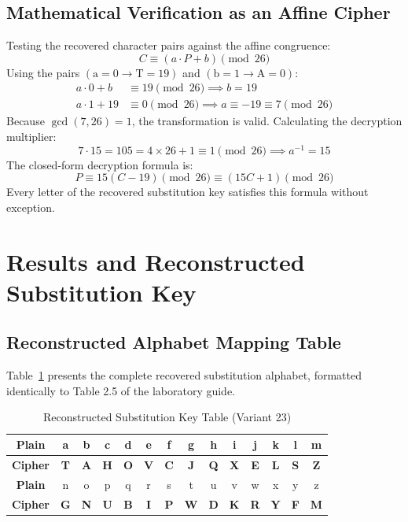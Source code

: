 \documentclass[12pt,a4paper]{article}
\begin{document}
\subsection{Mathematical Verification as an Affine Cipher}
Testing the recovered character pairs against the affine congruence:
\begin{equation}
    C \equiv (a \cdot P + b) \pmod{26}
\end{equation}
Using the pairs $(\text{a} = 0 \to \text{T} = 19)$ and $(\text{b} = 1 \to \text{A} = 0)$:
\begin{align}
    a \cdot 0 + b &\equiv 19 \pmod{26} \implies b = 19 \\
    a \cdot 1 + 19 &\equiv 0 \pmod{26} \implies a \equiv -19 \equiv 7 \pmod{26}
\end{align}
Because $\gcd(7, 26) = 1$, the transformation is valid. Calculating the decryption multiplier:
\begin{equation}
    7 \cdot 15 = 105 = 4 \times 26 + 1 \equiv 1 \pmod{26} \implies a^{-1} = 15
\end{equation}
The closed-form decryption formula is:
\begin{equation}
    P \equiv 15(C - 19) \pmod{26} \equiv (15C + 1) \pmod{26}
\end{equation}
Every letter of the recovered substitution key satisfies this formula without exception.

\section{Results and Reconstructed Substitution Key}

\subsection{Reconstructed Alphabet Mapping Table}
Table~\ref{tab:reconstructed_key} presents the complete recovered substitution alphabet, formatted identically to Table 2.5 of the laboratory guide.

\begin{table}[h!]
\centering
\caption{Reconstructed Substitution Key Table (Variant 23)}
\label{tab:reconstructed_key}
\small
\begin{tabular}{|c|c|c|c|c|c|c|c|c|c|c|c|c|c|}
\hline
\textbf{Plain} & a & b & c & d & e & f & g & h & i & j & k & l & m \\
\hline
\textbf{Cipher} & \textbf{T} & \textbf{A} & \textbf{H} & \textbf{O} & \textbf{V} & \textbf{C} & \textbf{J} & \textbf{Q} & \textbf{X} & \textbf{E} & \textbf{L} & \textbf{S} & \textbf{Z} \\
\hline
\hline
\textbf{Plain} & n & o & p & q & r & s & t & u & v & w & x & y & z \\
\hline
\textbf{Cipher} & \textbf{G} & \textbf{N} & \textbf{U} & \textbf{B} & \textbf{I} & \textbf{P} & \textbf{W} & \textbf{D} & \textbf{K} & \textbf{R} & \textbf{Y} & \textbf{F} & \textbf{M} \\
\hline
\end{tabular}
\end{table}
\end{document}

